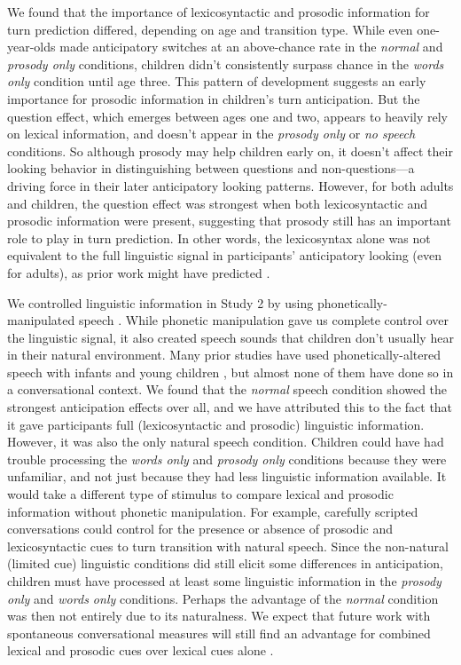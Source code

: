 \documentclass[authoryear, 12pt]{elsarticle}
\begin{document}
We found that the importance of lexicosyntactic and prosodic information for turn prediction differed, depending on age and transition type. While even one-year-olds made anticipatory switches at an above-chance rate in the \textit{normal} and \textit{prosody only} conditions, children didn't consistently surpass chance in the \textit{words only} condition until age three. This pattern of development suggests an early importance for prosodic information in children's turn anticipation. But the question effect, which emerges between ages one and two, appears to heavily rely on lexical information, and doesn't appear in the \textit{prosody only} or \textit{no speech} conditions. So although prosody may help children early on, it doesn't affect their looking behavior in distinguishing between questions and non-questions---a driving force in their later anticipatory looking patterns. However, for both adults and children, the question effect was strongest when both lexicosyntactic and prosodic information were present, suggesting that prosody still has an important role to play in turn prediction. In other words, the lexicosyntax alone was not equivalent to the full linguistic signal in participants' anticipatory looking (even for adults), as prior work might have predicted \citep{de-ruiter2006, magyari2012}.

We controlled linguistic information in Study 2 by using phonetically-manipulated speech \citep{de-ruiter2006}. While phonetic manipulation gave us complete control over the linguistic signal, it also created speech sounds that children don't usually hear in their natural environment. Many prior studies have used phonetically-altered speech with infants and young children \citep[cf.][]{jusczyk2000}, but almost none of them have done so in a conversational context. We found that the \textit{normal} speech condition showed the strongest anticipation effects over all, and we have attributed this to the fact that it gave participants full (lexicosyntactic and prosodic) linguistic information. However, it was also the only natural speech condition. Children could have had trouble processing the \textit{words only} and \textit{prosody only} conditions because they were unfamiliar, and not just because they had less linguistic information available. It would take a different type of stimulus to compare lexical and prosodic information without phonetic manipulation. For example, carefully scripted conversations could control for the presence or absence of prosodic and lexicosyntactic cues to turn transition with natural speech. Since the non-natural (limited cue) linguistic conditions did still elicit some differences in anticipation, children must have processed at least some linguistic information in the \textit{prosody only} and \textit{words only} conditions. Perhaps the advantage of the \textit{normal} condition was then not entirely due to its naturalness. We expect that future work with spontaneous conversational measures will still find an advantage for combined lexical and prosodic cues over lexical cues alone \citep[see also][]{duncan1972, ford1996, bogelsUndRev}.
\end{document}
